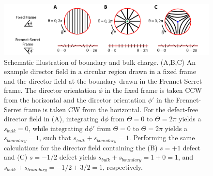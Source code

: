\begin{figure}
  \centering
  \includegraphics{figures/C3/Ch3-Figs_EdgeChargeEx.png}
  \caption{Schematic illustration of boundary and bulk charge.
  (A,B,C) An example director field in a circular region drawn in a fixed frame and the director field at the boundary drawn in the Frennet-Serret frame.
  The director orientation $\phi$ in the fixed frame is taken CCW from the horizontal and the director orientation $\phi'$ in the Frennet-Serret frame is taken CW from the horizontal.
  For the defect-free director field in (A), integrating $\textrm{d}\phi$ from $\Theta = 0$ to $\Theta = 2\pi$ yields a $s_{bulk} = 0$, while integrating $\textrm{d}\phi'$ from $\Theta = 0$ to $\Theta = 2\pi$ yields a $s_{boundary} = 1$, such that $s_{bulk} + s_{boundary}=1$.
  Performing the same calculations for the director field containing the (B) $s = +1$ defect and (C) $s = -1/2$ defect yields $s_{bulk} + s_{boundary}= 1 + 0= 1$, and $s_{bulk} + s_{boundary}= -1/2 + 3/2 = 1$, respectively.}\label{f:3-EdgeChargeEx}
\end{figure}

